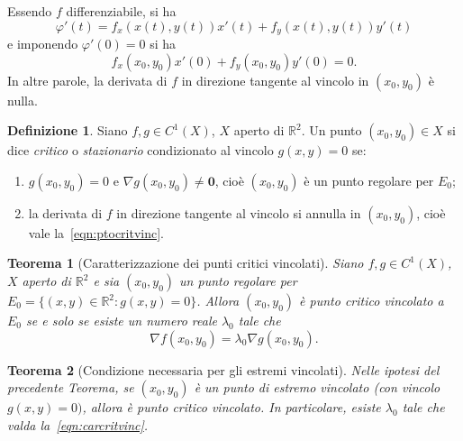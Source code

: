 \documentclass[a4paper]{book}
\numberwithin{equation}{section}
\renewcommand{\phi}{\varphi}
\theoremstyle{plain}
\newtheorem{teor}{Teorema}[section]
\theoremstyle{definition}
\newtheorem{defn}{Definizione}[section]
\theoremstyle{remark}
\renewcommand{\vec}{\boldsymbol}
\theoremstyle{example}
\begin{document}
	Essendo $f$ differenziabile, si ha
	\begin{equation*}
		\phi'(t) = f_x(x(t), y(t))x'(t) + f_y(x(t), y(t)) y'(t)
	\end{equation*}
	e imponendo $\phi'(0) = 0$ si ha
	\begin{equation}
		\label{eqn:ptocritvinc}
		f_x(x_0, y_0)x'(0) + f_y(x_0, y_0)y'(0) = 0.
	\end{equation}
	In altre parole, la derivata di $f$ in direzione tangente al vincolo in $(x_0, y_0)$ è nulla.

	\begin{defn}
		Siano $f, g \in C^1(X)$, $X$ aperto di $\mathbb{R}^2$. Un punto $(x_0, y_0) \in X$ si dice \emph{critico} o \emph{stazionario} condizionato al vincolo $g(x, y) = 0$ se:
		\begin{enumerate}
			\item $g(x_0, y_0) = 0$ e $\nabla g(x_0, y_0) \ne \vec{0}$, cioè $(x_0, y_0)$ è un punto regolare per $E_0$;
			\item la derivata di $f$ in direzione tangente al vincolo si annulla in $(x_0, y_0)$, cioè vale la~\eqref{eqn:ptocritvinc}.
		\end{enumerate}
	\end{defn}

	\begin{teor}[Caratterizzazione dei punti critici vincolati]
		\label{teor:carcritvinc}
		Siano $f, g \in C^1(X)$, $X$ aperto di $\mathbb{R}^2$ e sia $(x_0, y_0)$ un punto regolare per $E_0 = \{ (x,y) \in \mathbb{R}^2 \colon g(x,y) = 0\}$. Allora $(x_0, y_0)$ è punto critico vincolato a $E_0$ se e solo se esiste un numero reale $\lambda_0$ tale che
		\begin{equation}
			\label{eqn:carcritvinc}
			\nabla f(x_0, y_0) = \lambda_0 \nabla g(x_0, y_0).
		\end{equation}
	\end{teor}

	\begin{teor}[Condizione necessaria per gli estremi vincolati]
		Nelle ipotesi del precedente Teorema, se $(x_0, y_0)$ è un punto di estremo vincolato (con vincolo $g(x, y) = 0)$, allora è punto critico vincolato. In particolare, esiste $\lambda_0$ tale che valda la~\eqref{eqn:carcritvinc}.
	\end{teor}
\end{document}
